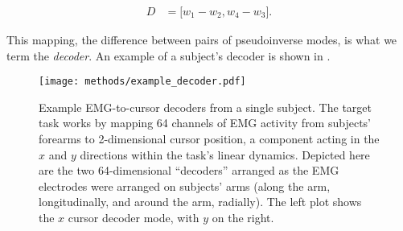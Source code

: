 \documentclass[../main.tex]{subfiles}
\begin{document}
\begin{align}
  D &= \lbrack w_1 - w_2, w_4 - w_3 \rbrack.
\end{align}

This mapping, the difference between pairs of pseudoinverse modes, is what we term the \textit{decoder}. An example of a subject's decoder is shown in .


\begin{figure}[!htb]
  \centering
  \texttt{[image: methods/example\_decoder.pdf]}
  \caption[Example subject decoder]{Example EMG-to-cursor decoders from a single subject. The target task works by mapping 64 channels of EMG activity from subjects' forearms to 2-dimensional cursor position, a component acting in the $x$ and $y$ directions within the task's linear dynamics. Depicted here are the two 64-dimensional ``decoders'' arranged as the EMG electrodes were arranged on subjects' arms (along the arm, longitudinally, and around the arm, radially). The left plot shows the $x$ cursor decoder mode, with $y$ on the right.}\label{fig:example_decoder}
\end{figure}







\end{document}
